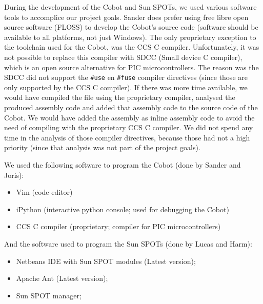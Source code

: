 \documentclass[a4paper,10pt]{article} %
\begin{document}
During the development of the Cobot and Sun SPOTs, we used various software
tools to accomplice our project goals. Sander does prefer using free libre open
source software (FLOSS) to develop the Cobot's source code (software should be
available to all platforms, not just Windows). The only proprietary exception to
the toolchain used for the Cobot, was the CCS C compiler. Unfortunately, it was
not possible to replace this compiler with SDCC (Small device C compiler), which
is an open source alternative for PIC microcontrollers. The reason was the SDCC
did not support the \texttt{\#use} en \texttt{\#fuse} compiler directives (since
those are only supported by the CCS C compiler). If there was more time
available, we would have compiled the file using the proprietary compiler,
analysed the produced assembly code and added that assembly code to the source
code of the Cobot. We would have added the assembly as inline assembly code to
avoid the need of compiling with the proprietary CCS C compiler. We did not
spend any time in the analysis of those compiler directives, because those had
not a high priority (since that analysis was not part of the project goals).

\noindent We used the following software to program the Cobot (done by Sander
and Joris):

\begin{itemize}
    \item Vim (code editor)
    \item iPython (interactive python console; used for debugging the Cobot)
    \item CCS C compiler (proprietary; compiler for PIC microcontrollers)
\end{itemize}

\noindent And the software used to program the Sun SPOTs (done by Lucas and
Harm):

\begin{itemize}
    \item Netbeans IDE with Sun SPOT modules (Latest version);
    \item Apache Ant (Latest version);
    \item Sun SPOT manager;
\end{itemize}





\end{document}
